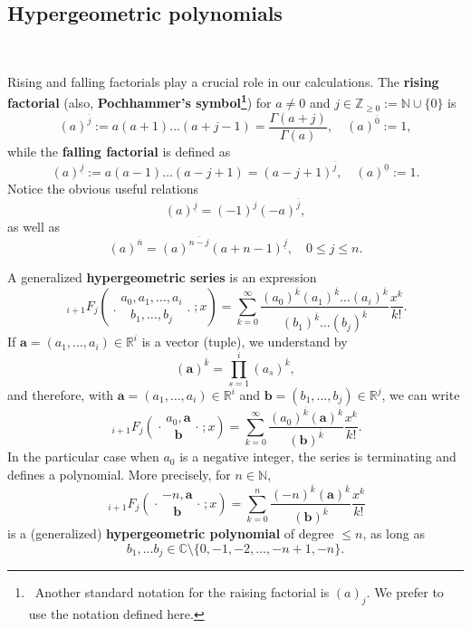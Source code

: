 \documentclass[reqno,11pt]{amsart}
\theoremstyle{remark}
\newcommand{\R}{\mathbb{R}}
\newcommand{\C}{\mathbb{C}}
\newcommand{\N}{\mathbb{N}}
\newcommand{\raising}[2]{\left(#1\right)^{\overline{#2}}}
\newcommand{\falling}[2]{\left(#1\right)^{\underline{#2}}}
\newcommand*\HGF[5]{%
 {\ }_{#1} F_{#2}{\left(\genfrac..{0pt}{}{#3}{#4};#5\right)}%
}
\begin{document}
\subsection{Hypergeometric polynomials} \label{subsec:HGpolynomials}\

Rising and falling factorials play a crucial role in our calculations. The \textbf{rising factorial} (also, \textbf{Pochhammer's symbol\footnote{\, Another standard notation for the raising factorial is $(a)_j$. We prefer to use the notation defined here.}})  for $a\ne 0$ and $j\in \mathbb Z_{\ge 0}:= \N \cup \{0\}$ is  
$$
\raising{a}{j}:=a(a+1)\dots(a+j-1)= \frac{\Gamma(a+j)}{\Gamma(a)}, \quad \raising{a}{0}:=1,$$
while the \textbf{falling factorial} is defined as
$$
\falling{a}{j}:=a(a-1)\dots(a-j+1)= \raising{a-j+1}{j}, \quad \falling{a}{0}:=1.
$$
Notice the obvious useful relations
\begin{equation}
    \label{connectionRandL}
    \falling{a}{j}=(-1)^j \raising{-a}{j}, 
\end{equation}
as well as 
\begin{equation}
    \label{connectionRandL2}
     \raising{a}{n} = \raising{a}{n-j} \falling{a+n-1}{j}, \quad 0\le j \le n.
\end{equation}

A generalized \textbf{hypergeometric series} \cite{MR2656096, MR2723248} is an expression 
\begin{equation} \label{hypergeoSeries}
\HGF{i+1}{j}{a_0, a_1, \dots, a_i}{b_1, \dots, b_j}{x}=\sum_{k=0}^\infty  \frac{\raising{a_0}{k} \raising{a_1}{k}\dots\raising{a_i}{k}}{\raising{b_1}{k} \dots\raising{b_j}{k}} \frac{x^k}{k!}.
\end{equation}
If $\bm a =(a_1, \dots, a_i)\in \R^i$ is a vector (tuple), we understand by
$$
\raising{\bm a}{k} =\prod_{s=1}^i \raising{a_s}{k},
$$
and therefore, with $\bm a =(a_1, \dots, a_i)\in \R^i$ and $\bm b =(b_1, \dots, b_j)\in \R^j$, we can write 
\begin{equation} \label{hypergeoSeriesBis}
\HGF{i+1}{j}{a_0, \bm a}{\bm b}{x}=\sum_{k=0}^\infty  \frac{\raising{a_0}{k} \raising{\bm a }{k} }{\raising{\bm b }{k}  } \frac{x^k}{k !}.
\end{equation}
In the particular case when $a_0$ is a negative integer, the series is terminating and defines a polynomial. More precisely, for $n\in \N$, 
$$
 \HGF{i+1}{j}{-n, \bm a  }{\bm b }{x}=\sum_{k=0}^n  \frac{\raising{-n}{k} \raising{\bm a }{k} }{\raising{\bm b }{k}  } \frac{x^k}{k !}
$$
is a (generalized) \textbf{hypergeometric polynomial} of degree $ \le n$, as long as 
\begin{equation*}  
    b_1,\dots b_j \in \C \setminus \{0, -1,-2,\dots, -n+1 , -n\}.
\end{equation*}
\end{document}
